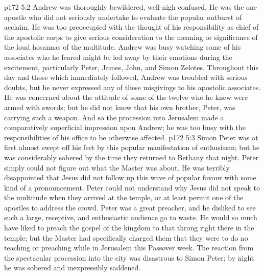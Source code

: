 \vs p172 5:2 Andrew was thoroughly bewildered, well\hyp{}nigh confused. He was the one apostle who did not seriously undertake to evaluate the popular outburst of acclaim. He was too preoccupied with the thought of his responsibility as chief of the apostolic corps to give serious consideration to the meaning or significance of the loud hosannas of the multitude. Andrew was busy watching some of his associates who he feared might be led away by their emotions during the excitement, particularly Peter, James, John, and Simon Zelotes. Throughout this day and those which immediately followed, Andrew was troubled with serious doubts, but he never expressed any of these misgivings to his apostolic associates. He was concerned about the attitude of some of the twelve who he knew were armed with swords; but he did not know that his own brother, Peter, was carrying such a weapon. And so the procession into Jerusalem made a comparatively superficial impression upon Andrew; he was too busy with the responsibilities of his office to be otherwise affected.
\vs p172 5:3 Simon Peter was at first almost swept off his feet by this popular manifestation of enthusiasm; but he was considerably sobered by the time they returned to Bethany that night. Peter simply could not figure out what the Master was about. He was terribly disappointed that Jesus did not follow up this wave of popular favour with some kind of a pronouncement. Peter could not understand why Jesus did not speak to the multitude when they arrived at the temple, or at least permit one of the apostles to address the crowd. Peter was a great preacher, and he disliked to see such a large, receptive, and enthusiastic audience go to waste. He would so much have liked to preach the gospel of the kingdom to that throng right there in the temple; but the Master had specifically charged them that they were to do no teaching or preaching while in Jerusalem this Passover week. The reaction from the spectacular procession into the city was disastrous to Simon Peter; by night he was sobered and inexpressibly saddened.
